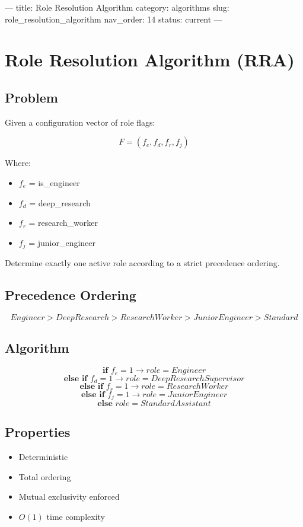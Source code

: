 ---
title: Role Resolution Algorithm
category: algorithms
slug: role_resolution_algorithm
nav_order: 14
status: current
---

\section{Role Resolution Algorithm (RRA)}

\subsection*{Problem}

Given a configuration vector of role flags:

\[
F = (f_e, f_d, f_r, f_j)
\]

Where:

\begin{itemize}
    \item $f_e$ = is\_engineer
    \item $f_d$ = deep\_research
    \item $f_r$ = research\_worker
    \item $f_j$ = junior\_engineer
\end{itemize}

Determine exactly one active role according to a strict precedence ordering.

\subsection*{Precedence Ordering}

\[
Engineer > DeepResearch > ResearchWorker > JuniorEngineer > Standard
\]

\subsection*{Algorithm}

\[
\textbf{if } f_e = 1 \rightarrow role = Engineer
\]
\[
\textbf{else if } f_d = 1 \rightarrow role = DeepResearchSupervisor
\]
\[
\textbf{else if } f_r = 1 \rightarrow role = ResearchWorker
\]
\[
\textbf{else if } f_j = 1 \rightarrow role = JuniorEngineer
\]
\[
\textbf{else } role = StandardAssistant
\]

\subsection*{Properties}

\begin{itemize}
    \item Deterministic
    \item Total ordering
    \item Mutual exclusivity enforced
    \item $O(1)$ time complexity
\end{itemize}